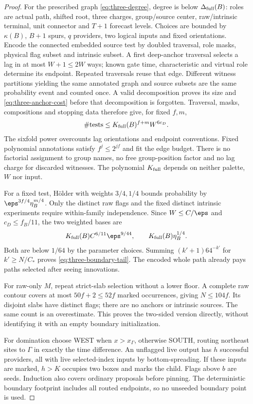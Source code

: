 \begin{proof}
For the prescribed graph \eqref{eq:three-degree}, degree is below $\Delta_{\rm full}(B)$: roles are actual path, shifted root, three charges, group/source center, raw/intrinsic terminal, unit connector and $T+1$ forecast levels. Choices are bounded by $\kappa(B)$, $B+1$ spurs, $q$ providers, two logical inputs and fixed orientations. Encode the connected embedded source test by doubled traversal, role masks, physical flag subset and intrinsic subset. A first deep-anchor traversal selects a lag in at most $W+1\le2W$ ways; known gate time, characteristic and virtual role determine its endpoint. Repeated traversals reuse that edge. Different witness partitions yielding the same annotated graph and source subsets are the same probability event and counted once. A valid decomposition proves its size and \eqref{eq:three-anchor-cost} before that decomposition is forgotten. Traversal, masks, compositions and stopping data therefore give, for fixed $f,m$,
\[
 \#\text{tests}\le K_{\rm full}(B)^{f+m}W^{6c_D}.
\]
The sixfold power overcounts lag orientations and endpoint conventions. Fixed polynomial annotations satisfy $f^j\le2^{jf}$ and fit the edge budget. There is no factorial assignment to group names, no free group-position factor and no lag charge for discarded witnesses. The polynomial $K_{\rm full}$ depends on neither palette, $W$ nor input.

For a fixed test, H\"older with weights $3/4,1/4$ bounds probability by $\eps^{3f/4}\eta_B^{m/4}$. Only the distinct raw flags and the fixed distinct intrinsic experiments require within-family independence. Since $W\le C/\eps$ and $c_D\le f_B/11$, the two weighted bases are
\[
 K_{\rm full}(B)C^{6/11}\eps^{9/44},\qquad
 K_{\rm full}(B)\eta_B^{1/4}.
\]
Both are below $1/64$ by the parameter choices. Summing $(k'+1)64^{-k'}$ for $k'\ge N/C_*$ proves \eqref{eq:three-boundary-tail}. The encoded whole path already pays paths selected after seeing innovations.

For raw-only $M$, repeat strict-slab selection without a lower floor. A complete raw contour covers at most $50f+2\le52f$ marked occurrences, giving $N\le104f$. Its disjoint slabs have distinct flags; there are no anchors or intrinsic sources. The same count is an overestimate. This proves the two-sided version directly, without identifying it with an empty boundary initialization.

For domination choose WEST when $x>x_\Gamma$, otherwise SOUTH, routing northeast sites to $\Gamma$ in exactly the time difference. An unflagged live output has $h$ successful providers, all with live selected-index inputs by bottom-spreading. If these inputs are marked, $h>K$ occupies two boxes and marks the child. Flags above $b$ are seeds. Induction also covers ordinary proposals before pinning. The deterministic boundary footprint includes all routed endpoints, so no unseeded boundary point is used.
\end{proof}

